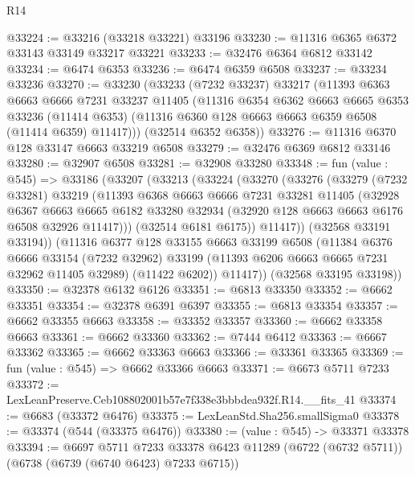 \begin{lexlean}{R14}
\begin{coremodule}
@33224 := @33216 (@33218 @33221) @33196
@33230 := @11316 @6365 @6372 @33143 @33149 @33217 @33221
@33233 := @32476 @6364 @6812 @33142
@33234 := @6474 @6353
@33236 := @6474 @6359 @6508
@33237 := @33234 @33236
@33270 := @33230
    (@33233
      (@7232 @33237)
      @33217
      (@11393
        @6363
        @6663
        @6666
        @7231
        @33237
        @11405
        (@11316
          @6354
          @6362
          @6663
          @6665
          @6353
          @33236
          (@11414 @6353)
          (@11316 @6360 @128 @6663 @6663 @6359 @6508 (@11414 @6359) @11417)))
      (@32514 @6352 @6358))
@33276 := @11316 @6370 @128 @33147 @6663 @33219 @6508
@33279 := @32476 @6369 @6812 @33146
@33280 := @32907 @6508
@33281 := @32908 @33280
@33348 := fun (value : @545) =>
  @33186
    (@33207
      (@33213
        (@33224
          (@33270
            (@33276
              (@33279
                (@7232 @33281)
                @33219
                (@11393
                  @6368
                  @6663
                  @6666
                  @7231
                  @33281
                  @11405
                  (@32928
                    @6367
                    @6663
                    @6665
                    @6182
                    @33280
                    @32934
                    (@32920 @128 @6663 @6663 @6176 @6508 @32926 @11417)))
                (@32514 @6181 @6175))
              @11417))
          (@32568 @33191 @33194))
        (@11316
          @6377
          @128
          @33155
          @6663
          @33199
          @6508
          (@11384
            @6376
            @6666
            @33154
            (@7232 @32962)
            @33199
            (@11393 @6206 @6663 @6665 @7231 @32962 @11405 @32989)
            (@11422 @6202))
          @11417))
      (@32568 @33195 @33198))
@33350 := @32378 @6132 @6126
@33351 := @6813 @33350
@33352 := @6662 @33351
@33354 := @32378 @6391 @6397
@33355 := @6813 @33354
@33357 := @6662 @33355 @6663
@33358 := @33352 @33357
@33360 := @6662 @33358 @6663
@33361 := @6662 @33360
@33362 := @7444 @6412
@33363 := @6667 @33362
@33365 := @6662 @33363 @6663
@33366 := @33361 @33365
@33369 := fun (value : @545) => @6662 @33366 @6663
@33371 := @6673 @5711 @7233
@33372 := LexLeanPreserve.Ceb108802001b57e7f338e3bbbdea932f.R14.__fits_41
@33374 := @6683 (@33372 @6476)
@33375 := LexLeanStd.Sha256.smallSigma0
@33378 := @33374 (@544 (@33375 @6476))
@33380 := (value : @545) -> @33371 @33378
@33394 := @6697
    @5711
    @7233
    @33378
    @6423
    @11289
    (@6722 (@6732 @5711))
    (@6738 (@6739 (@6740 @6423) @7233 @6715))

\end{coremodule}
\end{lexlean}
